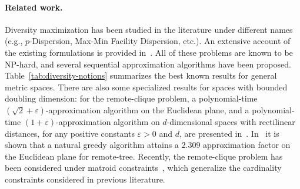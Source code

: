 \documentclass{article}
\renewcommand{\epsilon}{\varepsilon}
\begin{document}
\iffalse More specifically, in the
Streaming model we have a single processor with memory space that is
significantly smaller than the total size of the data stream, while,
in MapReduce, the local memory of each reducer (processor) is
polynomially sublinear in the total data size. An obvious question is
how this limitations affect the quality of the approximation for the
various diversity problems. In this work, we provide an answer to this
question, focusing on the case of metric spaces of bounded doubling
dimension, a class of metric spaces that has attracted significant
interest in the context of data analysis, and that includes the
important family of Euclidean spaces of constant dimension.  
\fi



\paragraph{Related work.}
\sloppy
Diversity maximization has been studied in the literature under
different names (e.g., $p$-Dispersion, Max-Min Facility Dispersion,
etc.).  An extensive account of the existing formulations is provided
in~\cite{ChandraH01}. All of these problems are known to be NP-hard,
and several sequential approximation algorithms have been proposed.
Table~\ref{tab:diversity-notions} summarizes the best known results
for general metric spaces.  There are also some specialized results
for spaces with bounded doubling dimension: for the remote-clique
problem, a polynomial-time $(\sqrt{2}+\epsilon)$-approximation
algorithm on the Euclidean plane, and a polynomial-time
$(1+\epsilon)$-approximation algorithm on $d$-dimensional spaces with
rectilinear distances, for any positive constants $\epsilon > 0$ and
$d$, are presented in~\cite{FeketeM04}.  In~\cite{HalldorssonIKT99} it
is shown that a natural greedy algorithm attains a $2.309$
approximation factor on the Euclidean plane for remote-tree. Recently,
the remote-clique problem has been considered under matroid
constraints~\cite{AbbassiMT13,CevallosEZ16}, which generalize the
cardinality constraints considered in previous literature.
\end{document}
